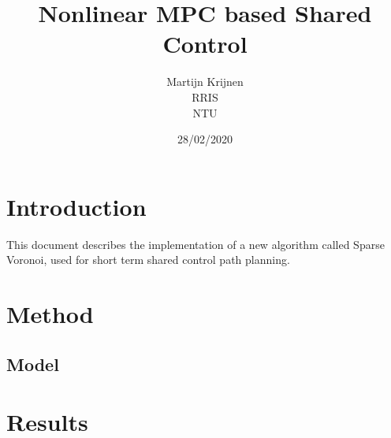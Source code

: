 \documentclass[a4paper,10pt]{article}
\begin{document}
\title{Nonlinear MPC based Shared Control}



\author{Martijn Krijnen \\
RRIS \\
NTU \\
}
\date{28/02/2020}

\maketitle



\section{Introduction}
This document describes the implementation of a new algorithm called Sparse Voronoi, used for short term shared control path planning.


\section{Method} \label{sec:criteria}

\subsection{Model}

\section{Results}

\end{document}
